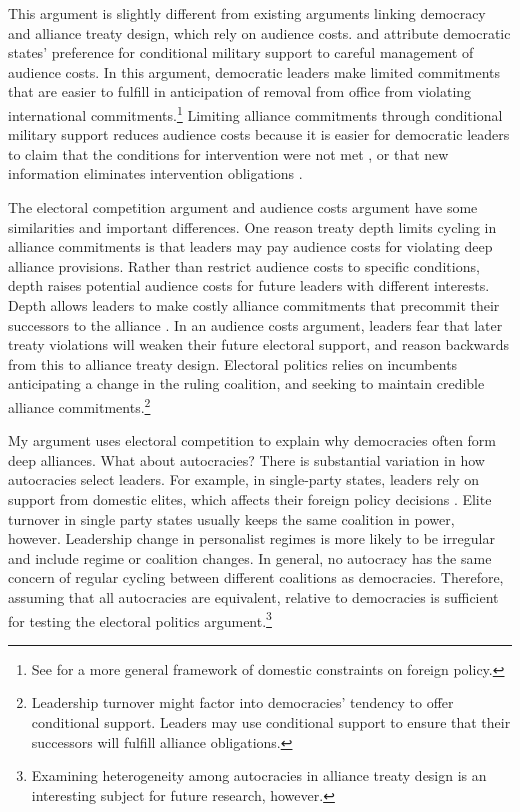 \documentclass[12pt]{article}
\begin{document}
This argument is slightly different from existing arguments linking democracy and alliance treaty design, which rely on audience costs. 
\citet{Mattes2012} and \citet{Chibaetal2015} attribute democratic states' preference for conditional military support to careful management of audience costs. 
In this argument, democratic leaders make limited commitments that are easier to fulfill in anticipation of removal from office from violating international commitments.\footnote{See \citet{HydeSaunders2020} for a more general framework of domestic constraints on foreign policy.} 
Limiting alliance commitments through conditional military support reduces audience costs because it is easier for democratic leaders to claim that the conditions for intervention were not met \citep{FjelstulReiter2019}, or that new information eliminates intervention obligations \citep{LevenduskyHorowitz2012}. 


The electoral competition argument and audience costs argument have some similarities and important differences. 
One reason treaty depth limits cycling in alliance commitments is that leaders may pay audience costs for violating deep alliance provisions. 
Rather than restrict audience costs to specific conditions, depth raises potential audience costs for future leaders with different interests. 
Depth allows leaders to make costly alliance commitments that precommit their successors to the alliance \citep{Mattes2012a}. 
In an audience costs argument, leaders fear that later treaty violations will weaken their future electoral support, and reason backwards from this to alliance treaty design. 
Electoral politics relies on incumbents anticipating a change in the ruling coalition, and seeking to maintain credible alliance commitments.\footnote{Leadership turnover might factor into democracies' tendency to offer conditional support. Leaders may use conditional support to ensure that their successors will fulfill alliance obligations.} 


My argument uses electoral competition to explain why democracies often form deep alliances. 
What about autocracies? 
There is substantial variation in how autocracies select leaders. 
For example, in single-party states, leaders rely on support from domestic elites, which affects their foreign policy decisions \citep{Weeks2014}.
Elite turnover in single party states usually keeps the same coalition in power, however.  
Leadership change in personalist regimes is more likely to be irregular and include regime or coalition changes.   
In general, no autocracy has the same concern of regular cycling between different coalitions as democracies.
Therefore, assuming that all autocracies are equivalent, relative to democracies is sufficient for testing the electoral politics argument.\footnote{Examining heterogeneity among autocracies in alliance treaty design is an interesting subject for future research, however.} 
\end{document}
